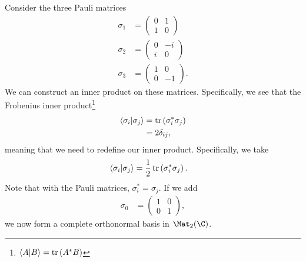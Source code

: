 \documentclass[10pt]{mypackage}
\begin{document}
\begin{example}
Consider the three Pauli matrices
\begin{align*}
  \sigma_{1} &= \begin{pmatrix}0 & 1 \\ 1 & 0\end{pmatrix}\\
  \sigma_2 &= \begin{pmatrix}0 & -i\\i & 0\end{pmatrix}\\
  \sigma_3 &= \begin{pmatrix}1 & 0 \\ 0 & -1\end{pmatrix}.
\end{align*}
We can construct an inner product on these matrices. Specifically, we see that the Frobenius inner product\footnote{$\braket{A}{B} = \tr\left(A^{\ast}B\right)$}
\begin{align*}
  \braket{\sigma_i}{\sigma_j} &= \tr\left(\sigma^{\ast}_i \sigma_j\right)\\
                              &= 2\delta_{ij},
\end{align*}
meaning that we need to redefine our inner product. Specifically, we take
\begin{align*}
  \braket{\sigma_i}{\sigma_j} &= \frac{1}{2}\tr\left(\sigma_{i}^{\ast}\sigma_j\right).
\end{align*}
Note that with the Pauli matrices, $\sigma_{i}^{\ast} = \sigma_j$. If we add
\begin{align*}
  \sigma_0 &= \begin{pmatrix}1 & 0 \\ 0 & 1\end{pmatrix},
\end{align*}
we now form a complete orthonormal basis in $\Mat_{2}(\C)$.\newline


\end{example}
\end{document}
